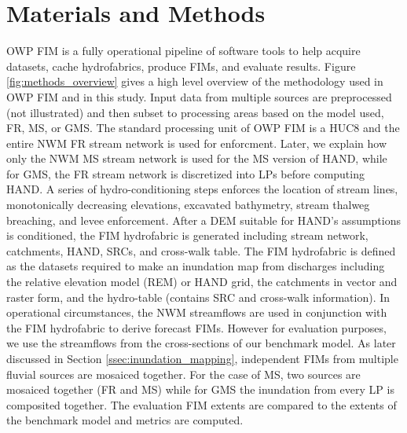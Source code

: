 \documentclass[draft]{dependencies/agujournal2019}
\begin{document}
\section{Materials and Methods}
\label{sec:materials_and_methods}
%
OWP FIM is a fully operational pipeline of software tools to help acquire datasets, cache hydrofabrics, produce FIMs, and evaluate results.
Figure \ref{fig:methods_overview} gives a high level overview of the methodology used in OWP FIM and in this study.
Input data from multiple sources are preprocessed (not illustrated) and then subset to processing areas based on the model used, FR, MS, or GMS.
The standard processing unit of OWP FIM is a HUC8 and the entire NWM FR stream network is used for enforcment.
Later, we explain how only the NWM MS stream network is used for the MS version of HAND, while for GMS, the FR stream network is discretized into LPs before computing HAND.
A series of hydro-conditioning steps enforces the location of stream lines, monotonically decreasing elevations, excavated bathymetry, stream thalweg breaching, and levee enforcement.
After a DEM suitable for HAND's assumptions is conditioned, the FIM hydrofabric is generated including stream network, catchments, HAND, SRCs, and cross-walk table.
The FIM hydrofabric is defined as the datasets required to make an inundation map from discharges including the relative elevation model (REM) or HAND grid, the catchments in vector and raster form, and the hydro-table (contains SRC and cross-walk information).
In operational circumstances, the NWM streamflows are used in conjunction with the FIM hydrofabric to derive forecast FIMs.
However for evaluation purposes, we use the streamflows from the cross-sections of our benchmark model.
As later discussed in Section \ref{ssec:inundation_mapping}, independent FIMs from multiple fluvial sources are mosaiced together.
For the case of MS, two sources are mosaiced together (FR and MS) while for GMS the inundation from every LP is composited together.
The evaluation FIM extents are compared to the extents of the benchmark model and metrics are computed.
%
\end{document}
